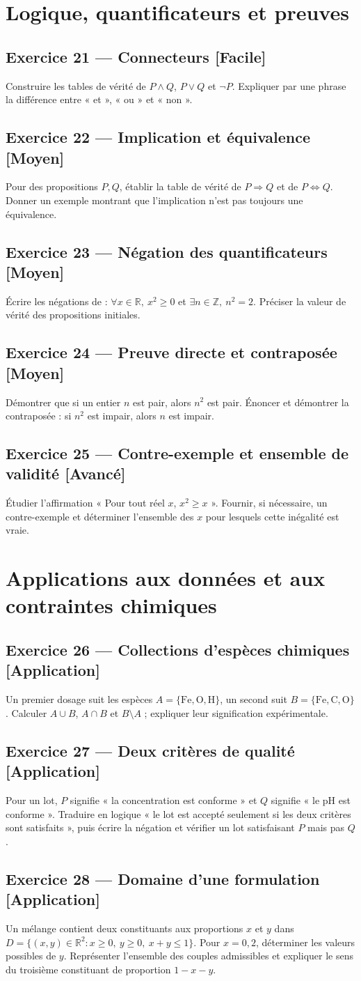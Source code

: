 \documentclass[11pt,a4paper,oneside]{article}
\newcommand{\exo}[3]{%
  \Needspace{6\baselineskip}%
  \subsection*{Exercice #1 --- #3 \hfill
  {\normalfont\footnotesize\color{GrisTexte}[#2]}}}
\begin{document}
\section{Logique, quantificateurs et preuves}

\exo{21}{Facile}{Connecteurs}
Construire les tables de vérité de $P\land Q$, $P\lor Q$ et $\neg P$.
Expliquer par une phrase la différence entre « et », « ou » et « non ».

\exo{22}{Moyen}{Implication et équivalence}
Pour des propositions $P,Q$, établir la table de vérité de $P\Rightarrow Q$ et de $P\Leftrightarrow Q$.
Donner un exemple montrant que l'implication n'est pas toujours une équivalence.

\exo{23}{Moyen}{Négation des quantificateurs}
Écrire les négations de :
$\forall x\in\mathbb R,\ x^2\ge0$ et
$\exists n\in\mathbb Z,\ n^2=2$.
Préciser la valeur de vérité des propositions initiales.

\exo{24}{Moyen}{Preuve directe et contraposée}
Démontrer que si un entier $n$ est pair, alors $n^2$ est pair. Énoncer et démontrer la contraposée : si $n^2$ est impair, alors $n$ est impair.

\exo{25}{Avancé}{Contre-exemple et ensemble de validité}
Étudier l'affirmation « Pour tout réel $x$, $x^2\ge x$ ».
Fournir, si nécessaire, un contre-exemple et déterminer l'ensemble des $x$ pour lesquels cette inégalité est vraie.

\section{Applications aux données et aux contraintes chimiques}

\exo{26}{Application}{Collections d'espèces chimiques}
Un premier dosage suit les espèces $A=\{\mathrm{Fe},\mathrm O,\mathrm H\}$, un second suit $B=\{\mathrm{Fe},\mathrm C,\mathrm O\}$.
Calculer $A\cup B$, $A\cap B$ et $B\setminus A$ ; expliquer leur signification expérimentale.

\exo{27}{Application}{Deux critères de qualité}
Pour un lot, $P$ signifie « la concentration est conforme » et $Q$ signifie « le pH est conforme ».
Traduire en logique « le lot est accepté seulement si les deux critères sont satisfaits », puis écrire la négation et vérifier un lot satisfaisant $P$ mais pas $Q$.

\exo{28}{Application}{Domaine d'une formulation}
Un mélange contient deux constituants aux proportions $x$ et $y$ dans
$D=\{(x,y)\in\mathbb R^2:x\ge0,\ y\ge0,\ x+y\le1\}$.
Pour $x=0{,}2$, déterminer les valeurs possibles de $y$. Représenter l'ensemble des couples admissibles et expliquer le sens du troisième constituant de proportion $1-x-y$.
\end{document}
